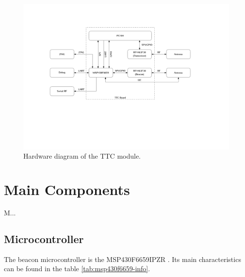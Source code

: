 \documentclass[12pt]{book}
\begin{document}
\begin{figure}[!h]
	\begin{center}
		\includegraphics[width=\textwidth]{figures/hardware_diagram.pdf}
		\caption{Hardware diagram of the TTC module.}
		\label{fig:hardware-diagram}
	\end{center}
\end{figure}

\section{Main Components}

M...

\subsection{Microcontroller}

The beacon microcontroller is the MSP430F6659IPZR \cite{msp430f6659}. Its main characteristics can be found in the table \ref{tab:msp430f6659-info}.

\end{document}
